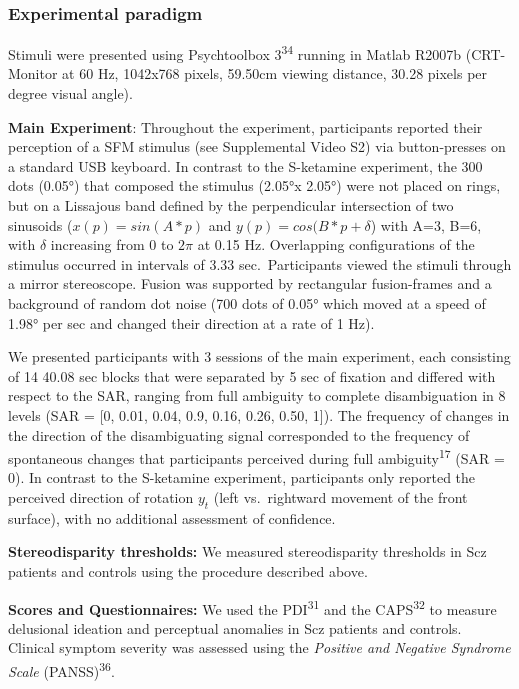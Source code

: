 \documentclass[
]{article}
\begin{document}
\subsubsection{Experimental paradigm}\label{experimental-paradigm-1}

Stimuli were presented using Psychtoolbox 3\textsuperscript{34} running
in Matlab R2007b (CRT-Monitor at 60 Hz, 1042x768 pixels, 59.50cm viewing
distance, 30.28 pixels per degree visual angle).

\textbf{Main Experiment}: Throughout the experiment, participants
reported their perception of a SFM stimulus (see Supplemental Video S2)
via button-presses on a standard USB keyboard. In contrast to the
S-ketamine experiment, the 300 dots (0.05°) that composed the stimulus
(2.05°x 2.05°) were not placed on rings, but on a Lissajous band defined
by the perpendicular intersection of two sinusoids (\(x(p) = sin(A*p)\)
and \(y(p) = cos(B*p + \delta\)) with A=3, B=6, with \(\delta\)
increasing from 0 to \(2\pi\) at 0.15 Hz. Overlapping configurations of
the stimulus occurred in intervals of 3.33 sec.~Participants viewed the
stimuli through a mirror stereoscope. Fusion was supported by
rectangular fusion-frames and a background of random dot noise (700 dots
of 0.05° which moved at a speed of 1.98° per sec and changed their
direction at a rate of 1 Hz).

We presented participants with 3 sessions of the main experiment, each
consisting of 14 40.08 sec blocks that were separated by 5 sec of
fixation and differed with respect to the SAR, ranging from full
ambiguity to complete disambiguation in 8 levels (SAR = {[}0, 0.01,
0.04, 0.9, 0.16, 0.26, 0.50, 1{]}). The frequency of changes in the
direction of the disambiguating signal corresponded to the frequency of
spontaneous changes that participants perceived during full
ambiguity\textsuperscript{17} (SAR = 0). In contrast to the S-ketamine
experiment, participants only reported the perceived direction of
rotation \(y_t\) (left vs.~rightward movement of the front surface),
with no additional assessment of confidence.

\textbf{Stereodisparity thresholds:} We measured stereodisparity
thresholds in Scz patients and controls using the procedure described
above.

\textbf{Scores and Questionnaires:} We used the PDI\textsuperscript{31}
and the CAPS\textsuperscript{32} to measure delusional ideation and
perceptual anomalies in Scz patients and controls. Clinical symptom
severity was assessed using the \emph{Positive and Negative Syndrome
Scale} (PANSS)\textsuperscript{36}.
\end{document}
